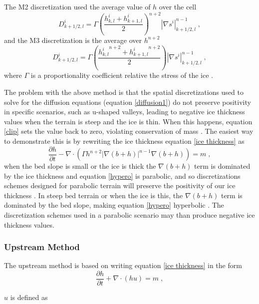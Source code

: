 \documentclass{article}
\begin{document}
The M2 discretization used the average value of $h$ over the cell
\begin{equation} \label{M2}
    D^i_{k+1/2,l}=\Gamma\left(\frac{h^i_{k,l}+h^i_{k+1,l}}{2}\right)^{n+2}|\nabla s ^i|^{n-1}_{k+1/2,l} \; ,
\end{equation}
and the M3 discretization is the average over $h^{n+2}$
\begin{equation} \label{M3}
    D^i_{k+1/2,l}=\Gamma\left(\frac{{h^i_{k,l}}^{n+2}+{h^i_{k+1,l}}^{n+2}}{2}\right)|\nabla s ^i|^{n-1}_{k+1/2,l} \; ,
\end{equation}
where $\Gamma$ is a proportionality coefficient relative the stress of the ice \citep{Jarosch2013}. 

The problem with the above method is that the spatial discretizations used to solve for the diffusion equations (equation \ref{diffusion1}) do not preserve positivity in specific scenarios, such as u-shaped valleys, leading to negative ice thickness values when the terrain is steep and the ice is thin. When this happens, equation \ref{clip} sets the value back to zero, violating conservation of mass \citep{Jarosch2013, Hindmarsh1996}. The easiest way to demonstrate this is by rewriting the ice thickness equation \ref{ice thickness} as
\begin{equation}\label{hypero}
\frac{\partial h}{\partial t} - \nabla \cdot \left( \Gamma h^{n+2} |\nabla(b+h)|^{n-1}\nabla(b+h)\right) =m \; ,
\end{equation}
when the bed slope is small or the ice is thick the  $\nabla(b+h)$ term is dominated by the ice thickness and equation \ref{hypero} is parabolic, and so discretizations schemes designed for parabolic terrain will preserve the positivity of our ice thickness \citep{Jarosch2013}. In steep bed terrain or when the ice is this, the $\nabla(b+h)$ term is dominated by the bed slope, making equation \ref{hypero} hyperbolic \citep{Jarosch2013}. The discretization schemes used in a parabolic scenario may than produce negative ice thickness values.
\subsubsection{Upstream Method}
The upstream method is based on writing equation \ref{ice thickness} in the form
\begin{equation} \label{upstream}
    \frac{\partial h}{\partial t} + \nabla \cdot (h u) = m \; ,
\end{equation}

$u$ is defined as
\end{document}
